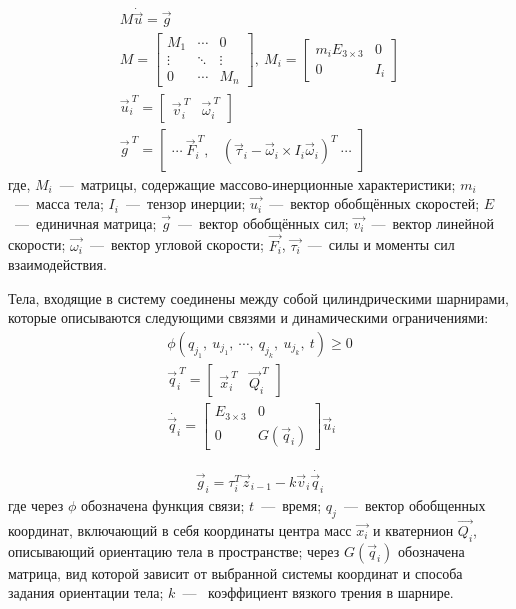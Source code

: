 \begin{eqnarray}
    \label{eq:newton_euler}
    M \dot{\vec{u}} = \vec{g} \\
    M = \begin{bmatrix}
    M_1 & \cdots  & 0 \\
    \vdots  & \ddots  & \vdots  \\ 
    0 & \cdots   & M_n 
    \end{bmatrix},\ M_i = \begin{bmatrix}
    m_i E_{3\times 3} & 0 \\ 
    0 & I_i 
    \end{bmatrix} \\
    \vec{u}_i^{\ T} = \begin{bmatrix}
        \vec{v}_i^{\ T} & \vec{\omega}_i^{\ T}
    \end{bmatrix} \\ 
    \vec{g}^{\ T} = \begin{bmatrix}
        \cdots \  \vec{F}_i^{\ T}, & (\vec{\tau}_i - \vec{\omega}_i \times I_i \vec{\omega}_i)^T\  \cdots 
    \end{bmatrix}
\end{eqnarray}
где, $M_i$~---~матрицы, содержащие массово-инерционные характеристики; $m_i$~---~масса тела; $I_i$~---~тензор инерции; $\vec{u_i}$~---~вектор обобщённых скоростей; $E$~---~единичная матрица; $\vec{g}$~---~вектор обобщённых сил; $\vec{v_i}$~---~вектор линейной скорости; $\vec{\omega_i}$~---~вектор угловой скорости; $\vec{F_i}$, $\vec{\tau_i}$~---~силы и моменты сил взаимодействия.

Тела, входящие в систему соединены между собой цилиндрическими шарнирами, которые описываются следующими связями и динамическими ограничениями:
\begin{eqnarray}
    \label{eq:kin_constr}
    \phi(q_{j_1},\ u_{j_1},\ \cdots,\ q_{j_k},\ u_{j_k},\ t) \geqslant  0 \\
    \vec{q}_i^{\ T} = \begin{bmatrix}
        \vec{x}_i^{\ T} & \vec{Q}_i^{\ T}
    \end{bmatrix} \\
    \dot{\vec{q}_i} = \begin{bmatrix}
    E_{3\times3} & 0\\ 
    0 & G(\vec{q}_i) 
    \end{bmatrix}\vec{u}_i  
\end{eqnarray}

\begin{eqnarray}
    \label{eq:phys_constr}
    \vec{g}_i = \tau_i^T \vec{z}_{i-1} -k\vec{v}_i \dot{\vec{q}_i} 
\end{eqnarray}
где через $\phi$ обозначена функция связи; $t$~---~время; $q_{j}$~---~вектор обобщенных координат, включающий в себя координаты центра масс $\vec{x_i}$ и кватернион $\vec{Q_i}$, описывающий ориентацию тела в пространстве; через $G(\vec{q}_i)$ обозначена матрица, вид которой зависит от выбранной системы координат и способа задания ориентации тела; $k$~---~ коэффициент вязкого трения в шарнире.

